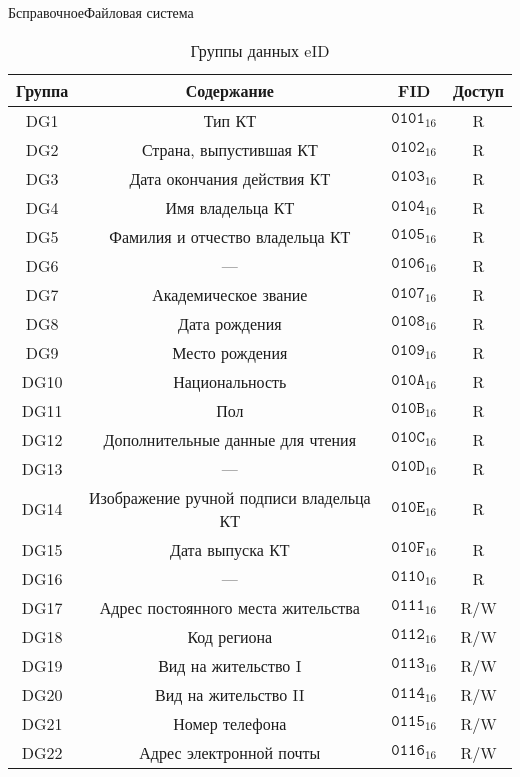 \begin{appendix}{Б}{справочное}{Файловая система}
\begin{table}[H]
\caption{Группы данных eID}
\label{Table.FILES.DG}
\begin{tabular}{|c|c|c|c|}
\hline
Группа & Содержание & FID & Доступ\\
\hline
\hline
DG1 & Тип КТ & 
$\texttt{0101}_{16}$ & R\\
DG2 & Страна, выпустившая КТ & 
$\texttt{0102}_{16}$ & R\\
DG3 & Дата окончания действия КТ & 
$\texttt{0103}_{16}$ & R\\
DG4 & Имя владельца КТ & 
$\texttt{0104}_{16}$ & R\\
DG5 & Фамилия и отчество владельца КТ & 
$\texttt{0105}_{16}$ & R\\
DG6 & 
--- & 
$\texttt{0106}_{16}$ & R\\
DG7 & Академическое звание & 
$\texttt{0107}_{16}$ & R\\
DG8 & Дата рождения & 
$\texttt{0108}_{16}$ & R\\
DG9 & Место рождения & 
$\texttt{0109}_{16}$ & R\\
DG10 & Национальность & 
$\texttt{010A}_{16}$ & R\\
DG11 & Пол & 
$\texttt{010B}_{16}$ & R\\
DG12 & Дополнительные данные для чтения & 
$\texttt{010C}_{16}$ & R\\
DG13 & 
--- &
$\texttt{010D}_{16}$ & R\\
DG14 & Изображение ручной подписи владельца КТ & 
$\texttt{010E}_{16}$ & R\\
DG15 & Дата выпуска КТ & 
$\texttt{010F}_{16}$ & R\\
DG16 & --- &  $\texttt{0110}_{16}$ & R\\
DG17 & 	Адрес постоянного места жительства & 
$\texttt{0111}_{16}$ & R/W\\
DG18 & 	Код региона & 
$\texttt{0112}_{16}$ & R/W\\
DG19 & 	Вид на жительство I & 
$\texttt{0113}_{16}$ & R/W\\
DG20 & 	Вид на жительство II & 
$\texttt{0114}_{16}$ & R/W\\
DG21 & 	Номер телефона & 
$\texttt{0115}_{16}$ & R/W\\
DG22 & 	Адрес электронной почты & 
$\texttt{0116}_{16}$ & R/W\\
\hline
\end{tabular}
\end{table}


\end{appendix}

